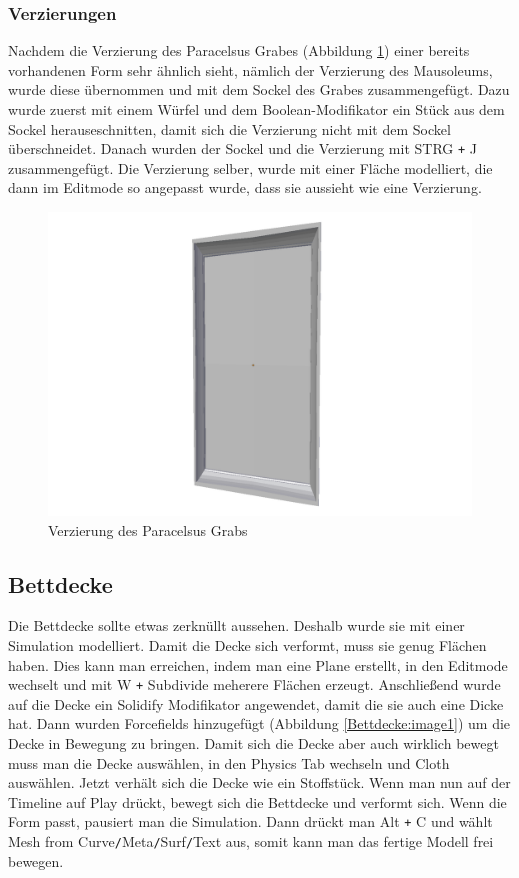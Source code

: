 \subsubsection{Verzierungen}
Nachdem die Verzierung des Paracelsus Grabes (Abbildung \ref{Paracelsus_Grab:image3}) einer bereits vorhandenen Form sehr ähnlich sieht, nämlich der Verzierung des Mausoleums, wurde diese übernommen und
mit dem Sockel des Grabes zusammengefügt. Dazu wurde zuerst mit einem Würfel und dem Boolean-Modifikator ein Stück aus dem Sockel herauseschnitten, damit
sich die Verzierung nicht mit dem Sockel überschneidet. Danach wurden der Sockel und die Verzierung mit STRG \verb-+- J zusammengefügt. Die Verzierung selber, wurde mit einer
Fläche modelliert, die dann im Editmode so angepasst wurde, dass sie aussieht wie eine Verzierung.
\begin{figure}[h]
    \centering
    \includegraphics[width=.8\textwidth]{images/Paracelsus-Grab_Verzierung.png}
    \caption{Verzierung des Paracelsus Grabs}
    \label{Paracelsus_Grab:image3}
\end{figure}

\subsection{Bettdecke}
Die Bettdecke sollte etwas zerknüllt aussehen. Deshalb wurde sie mit einer Simulation modelliert. Damit die Decke sich verformt, muss sie genug Flächen haben.
Dies kann man erreichen, indem man eine Plane erstellt, in den Editmode wechselt und mit W \verb-+- Subdivide meherere Flächen erzeugt. Anschließend wurde auf die Decke ein Solidify Modifikator
angewendet, damit die sie auch eine Dicke hat.
Dann wurden Forcefields hinzugefügt (Abbildung \ref{Bettdecke:image1}) um die Decke in Bewegung zu bringen. Damit sich die Decke aber auch wirklich bewegt muss man die Decke auswählen,
in den Physics Tab wechseln und Cloth auswählen. Jetzt verhält sich die Decke wie ein Stoffstück. Wenn man nun auf der Timeline auf Play drückt, bewegt sich die Bettdecke und verformt sich.
Wenn die Form passt, pausiert man die Simulation. Dann drückt man Alt \verb-+- C und wählt Mesh from Curve\verb-/-Meta\verb-/-Surf\verb-/-Text aus, somit kann man das fertige Modell
frei bewegen.

